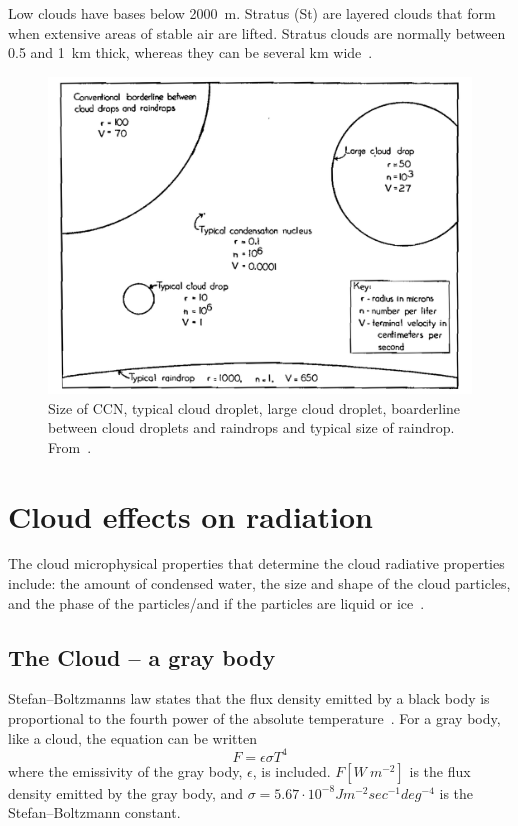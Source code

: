 Low clouds have bases below 2000~m. Stratus (St) are layered clouds that form when extensive areas of stable air are lifted. Stratus clouds are normally between 0.5 and 1~km thick, whereas they can be several km wide~\citep{Aguado2010}.

\begin{figure}
\centering
\includegraphics[width=1\textwidth]{theory/dropletsize.png}
\caption{Size of CCN, typical cloud droplet, large cloud droplet, boarderline between cloud droplets and raindrops and typical size of raindrop.%
 From~\citep{McDonald1958}.}
\label{fig:dropletsize}
\end{figure}
 
\section{Cloud effects on radiation}
The cloud microphysical properties that determine the cloud radiative properties include: the amount of condensed water, the size and shape of the cloud particles, and the phase of the particles/and if the particles are liquid or ice~\citep{Curry1996}.
\subsection{The Cloud -- a gray body}
Stefan–Boltzmanns law states that the flux density emitted by a black body is proportional to the fourth power of the absolute temperature~\citep{Liou2002}. For a gray body, like a cloud, the equation can be written
\begin{equation}
F = \epsilon \sigma T^4
\end{equation}
where the emissivity of the gray body, $\epsilon$, is included. $F [W~m^{-2}]$ is the flux density emitted by the gray body, and $\sigma = 5.67\cdot 10^{-8} Jm^{-2}sec^{-1}deg^{-4}$ is the Stefan–Boltzmann constant.

